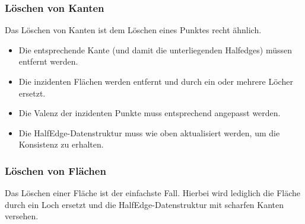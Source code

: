 \subsubsection{Löschen von Kanten}
Das Löschen von Kanten ist dem Löschen eines Punktes recht ähnlich.
\begin{itemize}
\item Die entsprechende Kante (und damit die unterliegenden Halfedges) müssen entfernt werden. 
\item Die inzidenten Flächen werden entfernt und durch ein oder mehrere Löcher ersetzt.
\item Die Valenz der inzidenten Punkte muss entsprechend angepasst werden.
\item Die HalfEdge-Datenstruktur muss wie oben aktualisiert werden, um die Konsistenz zu erhalten.
\end{itemize}

\subsubsection{Löschen von Flächen}
Das Löschen einer Fläche ist der einfachste Fall.
Hierbei wird lediglich die Fläche durch ein Loch ersetzt und die HalfEdge-Datenstruktur mit scharfen Kanten versehen.
